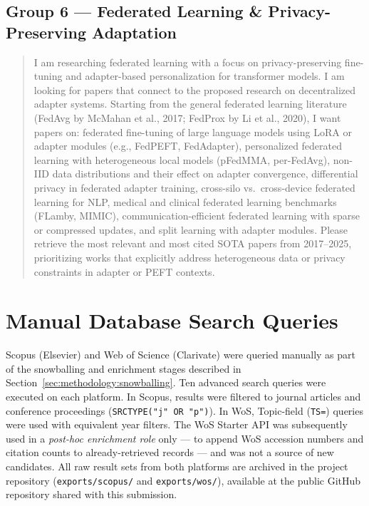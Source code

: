 \subsection*{Group 6 — Federated Learning \& Privacy-Preserving Adaptation}
\label{app:undermind:g6}

\begin{quote}\small
I am researching federated learning with a focus on privacy-preserving fine-tuning and
adapter-based personalization for transformer models. I am looking for papers that
connect to the proposed research on decentralized adapter systems. Starting from the general
federated learning literature (FedAvg by McMahan et al., 2017; FedProx by Li et al.,
2020), I want papers on: federated fine-tuning of large language models using LoRA or
adapter modules (e.g., FedPEFT, FedAdapter), personalized federated learning with
heterogeneous local models (pFedMMA, per-FedAvg), non-IID data distributions and
their effect on adapter convergence, differential privacy in federated adapter
training, cross-silo vs.\ cross-device federated learning for NLP, medical and
clinical federated learning benchmarks (FLamby, MIMIC), communication-efficient
federated learning with sparse or compressed updates, and split learning with adapter
modules. Please retrieve the most relevant and most cited SOTA papers from 2017--2025,
prioritizing works that explicitly address heterogeneous data or privacy constraints in
adapter or PEFT contexts.
\end{quote}


\section{Manual Database Search Queries}
\label{app:db_queries}

Scopus (Elsevier) and Web of Science (Clarivate) were queried manually as part of the
snowballing and enrichment stages described in Section~\ref{sec:methodology:snowballing}.
Ten advanced search queries were executed on each platform. In Scopus, results were
filtered to journal articles and conference proceedings (\texttt{SRCTYPE("j" OR "p")}).
In WoS, Topic-field (\texttt{TS=}) queries were used with equivalent year filters.
The WoS Starter API was subsequently used in a \textit{post-hoc enrichment role} only
--- to append WoS accession numbers and citation counts to already-retrieved records ---
and was not a source of new candidates. All raw result sets from both platforms are
archived in the project repository (\texttt{exports/scopus/} and \texttt{exports/wos/}),
available at the public GitHub repository shared with this submission.

